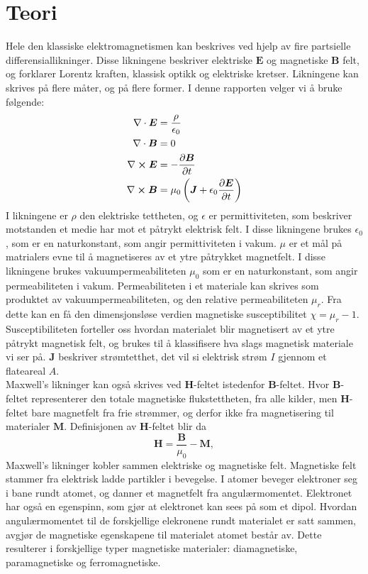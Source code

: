 \documentclass[%
 reprint,
nofootinbib,
aps,
]{revtex4-1}
\begin{document}
\section{Teori}
Hele den klassiske elektromagnetismen kan beskrives ved hjelp av fire partsielle differensiallikninger. Disse likningene beskriver elektriske $\bm{E}$ og magnetiske $\bm{B}$ felt, og forklarer Lorentz kraften, klassisk optikk og elektriske kretser. Likningene kan skrives på flere måter, og på flere former. I denne rapporten velger vi å bruke følgende:
\begin{align}
  \nabla \cdot \bm{E} &= \frac{\rho}{\epsilon_0} \label{1}\\
  \nabla \cdot \bm{B} &= 0 \label{2}\\
  \nabla \cross \bm{E} &= -\pdv{\bm{B}}{t} \label{3}\\
  \nabla \cross \bm{B} &= \mu_0\left(\bm{J} + \epsilon_0\pdv{\bm{E}}{t}\right) \label{4}
\end{align}
I likningene er $\rho$ den elektriske tettheten, og $\epsilon$ er permittiviteten, som beskriver motstanden et medie har mot et påtrykt elektrisk felt. I disse likningene brukes $\epsilon_0$, som er en naturkonstant, som angir permittiviteten i vakum. $\mu$ er et mål på matrialers evne til å magnetiseres av et ytre påtrykket magnetfelt. I disse likningene brukes vakuumpermeabiliteten $\mu_0$ som er en naturkonstant, som angir permeabiliteten i vakum. Permeabiliteten i et materiale kan skrives som produktet av vakuumpermeabiliteten, og den relative permeabiliteten $\mu_r$. Fra dette kan en få den dimensjonsløse verdien magnetiske susceptibilitet $\chi = \mu_r - 1$. Susceptibiliteten forteller oss hvordan materialet blir magnetisert av et ytre påtrykt magnetisk felt, og brukes til å klassifisere hva slags magnetisk materiale vi ser på. $\bm{J}$ beskriver strømtetthet, det vil si elektrisk strøm $I$ gjennom et flateareal $A$. \\
Maxwell's likninger kan også skrives ved $\bm{H}$-feltet istedenfor $\bm{B}$-feltet. Hvor $\bm{B}$-feltet representerer den totale magnetiske flukstettheten, fra alle kilder, men $\bm{H}$-feltet bare magnetfelt fra frie strømmer, og derfor ikke fra magnetisering til materialer $\bm{M}$. Definisjonen av $\bm{H}$-feltet blir da
\begin{equation}
  \bm{H} = \frac{\bm{B}}{\mu_0}-\bm{M}, \label{get_H}
\end{equation}
Maxwell's likninger kobler sammen elektriske og magnetiske felt. Magnetiske felt stammer fra elektrisk ladde partikler i bevegelse. I atomer beveger elektroner seg i bane rundt atomet, og danner et magnetfelt fra angulærmomentet. Elektronet har også en egenspinn, som gjør at elektronet kan sees på som et dipol. Hvordan angulærmomentet til de forskjellige elekronene rundt materialet er satt sammen, avgjør de magnetiske egenskapene til materialet atomet består av. Dette resulterer i forskjellige typer magnetiske materialer: diamagnetiske, paramagnetiske og ferromagnetiske.
\end{document}
